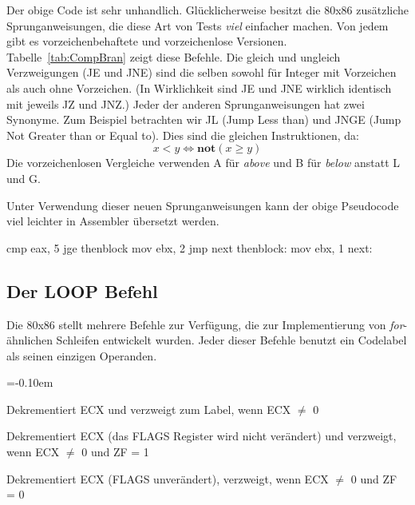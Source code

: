 Der obige Code ist sehr unhandlich. Gl\"{u}cklicherweise besitzt die
80x86 zus\"{a}tzliche Sprunganweisungen, die diese Art von Tests
\emph{viel} einfacher machen. Von jedem gibt es vorzeichenbehaftete
und vorzeichenlose Versionen. Tabelle~\ref{tab:CompBran} zeigt diese
Befehle. Die gleich und ungleich Verzweigungen (JE und JNE) sind die
selben sowohl f\"{u}r Integer mit Vorzeichen als auch ohne Vorzeichen.
(In Wirklichkeit sind JE und JNE wirklich identisch mit jeweils JZ
und JNZ.) Jeder der anderen Sprunganweisungen hat zwei Synonyme. Zum
Beispiel betrachten wir JL (Jump Less than) und JNGE (Jump Not
Greater than or Equal to). Dies sind die gleichen Instruktionen, da:
\[ x < y \Longleftrightarrow \mathbf{not}( x \geq y ) \]
Die vorzeichenlosen Vergleiche verwenden A f\"{u}r \emph{above} und B
f\"{u}r \emph{below} anstatt L und G\@.

Unter Verwendung dieser neuen Sprunganweisungen kann der obige
Pseudocode viel leichter in Assembler \"{u}bersetzt werden.
\begin{AsmCodeListing}[frame=none, numbers=left, firstnumber=last]
      cmp    eax, 5
      jge    thenblock
      mov    ebx, 2
      jmp    next
 thenblock:
      mov    ebx, 1
 next:
\end{AsmCodeListing}
 

\subsection{Der {\code LOOP} Befehl}

Die 80x86 stellt mehrere Befehle zur Verf\"{u}gung, die zur
Implementierung von \emph{for}-\"{a}hnlichen Schleifen entwickelt
wurden. Jeder dieser Befehle benutzt ein Code\-la\-bel als seinen
einzigen Operanden.
\begin{description}
\parskip=-0.10em %

\item[LOOP]
 Dekrementiert ECX und verzweigt zum
Label, wenn ECX $\neq$ 0

\item[LOOPE, LOOPZ]
 Dekrementiert ECX (das FLAGS
Register wird nicht ver\-\"{a}n\-dert) und verzweigt, wenn ECX $\neq$ 0
und ZF = 1

\item[LOOPNE, LOOPNZ]
 Dekrementiert ECX (FLAGS
unver\"{a}ndert), verzweigt, wenn ECX $\neq$ 0 und ZF = 0
\end{description}

